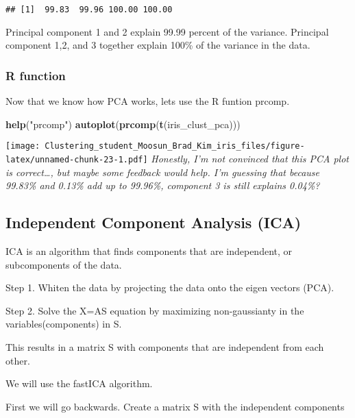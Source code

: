 \documentclass[11pt,]{article}
\newenvironment{Shaded}{\begin{snugshade}}{\end{snugshade}}
\newcommand{\KeywordTok}[1]{\textcolor[rgb]{0.13,0.29,0.53}{\textbf{#1}}}
\newcommand{\NormalTok}[1]{#1}
\newcommand{\StringTok}[1]{\textcolor[rgb]{0.31,0.60,0.02}{#1}}
\begin{document}
\begin{verbatim}
## [1]  99.83  99.96 100.00 100.00
\end{verbatim}

Principal component 1 and 2 explain 99.99 percent of the variance.
Principal component 1,2, and 3 together explain 100\% of the variance in
the data.

\hypertarget{r-function-2}{%
\subsubsection{R function}\label{r-function-2}}

Now that we know how PCA works, lets use the R funtion prcomp.

\begin{Shaded}
\begin{Highlighting}[]
\KeywordTok{help}\NormalTok{(}\StringTok{"prcomp"}\NormalTok{)}
\KeywordTok{autoplot}\NormalTok{(}\KeywordTok{prcomp}\NormalTok{(}\KeywordTok{t}\NormalTok{(iris_clust_pca)))}
\end{Highlighting}
\end{Shaded}

\texttt{[image: Clustering\_student\_Moosun\_Brad\_Kim\_iris\_files/figure-latex/unnamed-chunk-23-1.pdf]}
\emph{Honestly, I'm not convinced that this PCA plot is correct\ldots{},
but maybe some feedback would help. I'm guessing that because 99.83\%
and 0.13\% add up to 99.96\%, component 3 is still explains 0.04\%?}
\newpage

\hypertarget{independent-component-analysis-ica}{%
\subsection{Independent Component Analysis
(ICA)}\label{independent-component-analysis-ica}}

ICA is an algorithm that finds components that are independent, or
subcomponents of the data.

Step 1. Whiten the data by projecting the data onto the eigen vectors
(PCA).

Step 2. Solve the X=AS equation by maximizing non-gaussianty in the
variables(components) in S.

This results in a matrix S with components that are independent from
each other.

We will use the fastICA algorithm.

First we will go backwards. Create a matrix S with the independent
components
\end{document}
